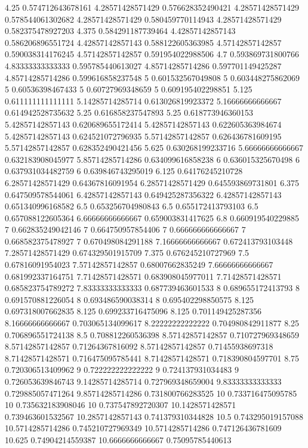 {4.25 0.574712643678161
4.28571428571429 0.576628352490421
4.28571428571429 0.578544061302682
4.28571428571429 0.580459770114943
4.28571428571429 0.582375478927203
4.375 0.584291187739464
4.42857142857143 0.586206896551724
4.42857142857143 0.588122605363985
4.57142857142857 0.590038314176245
4.57142857142857 0.591954022988506
4.7 0.593869731800766
4.83333333333333 0.595785440613027
4.85714285714286 0.597701149425287
4.85714285714286 0.599616858237548
5 0.601532567049808
5 0.603448275862069
5 0.60536398467433
5 0.60727969348659
5 0.609195402298851
5.125 0.611111111111111
5.14285714285714 0.613026819923372
5.16666666666667 0.614942528735632
5.25 0.616858237547893
5.25 0.618773946360153
5.42857142857143 0.620689655172414
5.42857142857143 0.622605363984674
5.42857142857143 0.624521072796935
5.57142857142857 0.626436781609195
5.57142857142857 0.628352490421456
5.625 0.630268199233716
5.66666666666667 0.632183908045977
5.85714285714286 0.634099616858238
6 0.636015325670498
6 0.637931034482759
6 0.639846743295019
6.125 0.64176245210728
6.28571428571429 0.64367816091954
6.28571428571429 0.645593869731801
6.375 0.647509578544061
6.42857142857143 0.649425287356322
6.42857142857143 0.651340996168582
6.5 0.653256704980843
6.5 0.655172413793103
6.5 0.657088122605364
6.66666666666667 0.659003831417625
6.8 0.660919540229885
7 0.662835249042146
7 0.664750957854406
7 0.666666666666667
7 0.668582375478927
7 0.670498084291188
7.16666666666667 0.672413793103448
7.28571428571429 0.674329501915709
7.375 0.676245210727969
7.5 0.67816091954023
7.57142857142857 0.68007662835249
7.66666666666667 0.681992337164751
7.71428571428571 0.683908045977011
7.71428571428571 0.685823754789272
7.83333333333333 0.687739463601533
8 0.689655172413793
8 0.691570881226054
8 0.693486590038314
8 0.695402298850575
8.125 0.697318007662835
8.125 0.699233716475096
8.125 0.701149425287356
8.16666666666667 0.703065134099617
8.22222222222222 0.704980842911877
8.25 0.706896551724138
8.5 0.708812260536398
8.57142857142857 0.710727969348659
8.57142857142857 0.71264367816092
8.57142857142857 0.71455938697318
8.71428571428571 0.716475095785441
8.71428571428571 0.718390804597701
8.75 0.720306513409962
9 0.722222222222222
9 0.724137931034483
9 0.726053639846743
9.14285714285714 0.727969348659004
9.83333333333333 0.729885057471264
9.85714285714286 0.731800766283525
10 0.733716475095785
10 0.735632183908046
10 0.737547892720307
10.1428571428571 0.739463601532567
10.2857142857143 0.741379310344828
10.5 0.743295019157088
10.5714285714286 0.745210727969349
10.5714285714286 0.747126436781609
10.625 0.74904214559387
10.6666666666667 0.75095785440613
}

